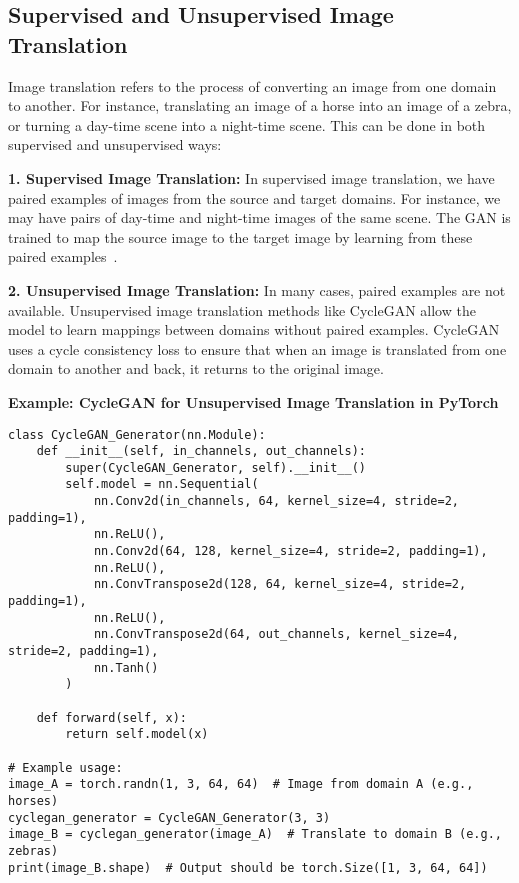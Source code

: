 \subsection{Supervised and Unsupervised Image Translation}
Image translation refers to the process of converting an image from one domain to another. For instance, translating an image of a horse into an image of a zebra, or turning a day-time scene into a night-time scene. This can be done in both supervised and unsupervised ways:

\textbf{1. Supervised Image Translation:}  
In supervised image translation, we have paired examples of images from the source and target domains. For instance, we may have pairs of day-time and night-time images of the same scene. The GAN is trained to map the source image to the target image by learning from these paired examples~\cite{abdal2019image2stylegan}.

\textbf{2. Unsupervised Image Translation:}  
In many cases, paired examples are not available. Unsupervised image translation methods like CycleGAN allow the model to learn mappings between domains without paired examples. CycleGAN uses a cycle consistency loss to ensure that when an image is translated from one domain to another and back, it returns to the original image.

\textbf{Example: CycleGAN for Unsupervised Image Translation in PyTorch}

\begin{lstlisting}[style=python]
class CycleGAN_Generator(nn.Module):
    def __init__(self, in_channels, out_channels):
        super(CycleGAN_Generator, self).__init__()
        self.model = nn.Sequential(
            nn.Conv2d(in_channels, 64, kernel_size=4, stride=2, padding=1),
            nn.ReLU(),
            nn.Conv2d(64, 128, kernel_size=4, stride=2, padding=1),
            nn.ReLU(),
            nn.ConvTranspose2d(128, 64, kernel_size=4, stride=2, padding=1),
            nn.ReLU(),
            nn.ConvTranspose2d(64, out_channels, kernel_size=4, stride=2, padding=1),
            nn.Tanh()
        )

    def forward(self, x):
        return self.model(x)

# Example usage:
image_A = torch.randn(1, 3, 64, 64)  # Image from domain A (e.g., horses)
cyclegan_generator = CycleGAN_Generator(3, 3)
image_B = cyclegan_generator(image_A)  # Translate to domain B (e.g., zebras)
print(image_B.shape)  # Output should be torch.Size([1, 3, 64, 64])
\end{lstlisting}

